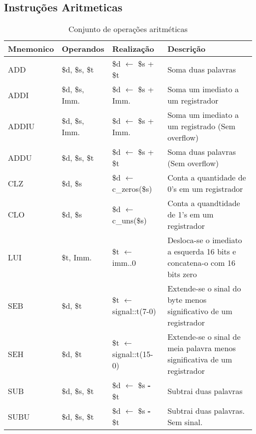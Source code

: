 \documentclass{report}
\begin{document}
  \subsection{Instruções Aritmeticas}
  \FloatBarrier
    \begin{table}[H]
      \begin{center}
        \begin{tabular}[pos]{|m{2.8cm}|m{2.8cm}|m{3cm}|m{4cm}|} 
          \hline
          \cellcolor[gray]{0.9}\textbf{Mnemonico} & \cellcolor[gray]{0.9}\textbf{Operandos} & \cellcolor[gray]{0.9}\textbf{Realização} & \cellcolor[gray]{0.9}\textbf{Descrição} \\ \hline
              ADD  & \$d, \$s, \$t & \$d $\leftarrow$ \$s + \$t &  Soma duas palavras\\ \hline
              ADDI  &  \$d, \$s, Imm. & \$d $\leftarrow$ \$s + Imm. &  Soma um imediato a um registrador\\ \hline
              ADDIU  &  \$d, \$s, Imm. & \$d $\leftarrow$ \$s + Imm. &  Soma um imediato a um registrado (Sem overflow) \\ \hline
              ADDU  &  \$d, \$s, \$t & \$d $\leftarrow$ \$s + \$t &  Soma duas palavras (Sem overflow) \\ \hline  
              CLZ  &  \$d, \$s& \$d $\leftarrow$ c\_zeros(\$s)&  Conta a quantidade de 0's em um registrador\\ \hline 
              CLO  & \$d, \$s & \$d $\leftarrow$ c\_uns(\$s) &  Conta a quandtidade de 1's em um registrador\\ \hline 
              LUI  &   \$t, Imm. & \$t $\leftarrow$ imm..0 &  Desloca-se o imediato a esquerda 16 bits e concatena-o com 16 bits zero \\ \hline 
              SEB  &  \$d, \$t & \$t $\leftarrow$ signal::t(7-0)  &  Extende-se o sinal do byte menos significativo de um registrador\\ \hline 
              SEH  & \$d, \$t & \$t $\leftarrow$ signal::t(15-0) &  Extende-se o sinal de meia palavra menos significativa de um registrador \\ \hline
              SUB  &  \$d, \$s, \$t &\$d $\leftarrow$ \$s \textbf{-} \$t &  Subtrai duas palavras\\ \hline 
              SUBU  & \$d, \$s, \$t & \$d $\leftarrow$ \$s \textbf{-} \$t &  Subtrai duas palavras. Sem sinal.\\ \hline 

        \end{tabular}
        \caption{Conjunto de operações aritméticas}
		\label{table:conjOpAri}
      \end{center}
    \end{table}
\end{document}
